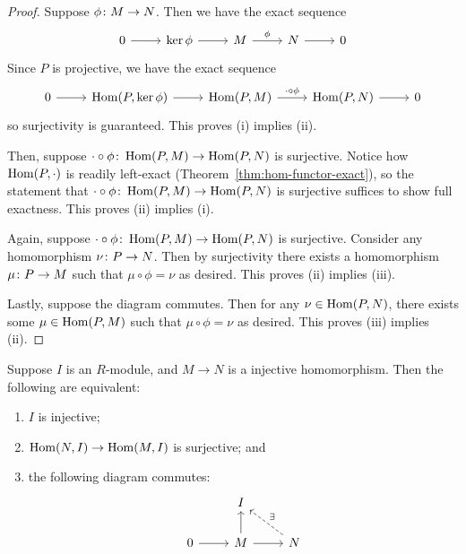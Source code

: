 \begin{proof}
    Suppose \(\phi\colon M\to N\).
    Then we have the exact sequence
    \begin{equation*}
        \begin{tikzcd}
            0 \arrow{r} & \ker\phi \arrow{r} & M \arrow{r}{\phi} & N \arrow{r} & 0
        \end{tikzcd}
    \end{equation*}
    Since \(P\) is projective, we have the exact sequence
    \begin{equation*}
        \begin{tikzcd}
            0 \arrow{r} & \Hom(P,\ker\phi) \arrow{r} &
            \Hom(P,M) \arrow{r}{\cdot\circ\phi} & \Hom(P,N) \arrow{r} & 0
        \end{tikzcd}
    \end{equation*}
    so surjectivity is guaranteed.
    This proves (i) implies (ii).

    Then, suppose \(\cdot\circ\phi\colon\operatorname{Hom}(P,M)\to\operatorname{Hom}(P,N)\) is surjective.
    Notice how \(\operatorname{Hom}(P,\cdot)\) is readily left-exact (Theorem~\ref{thm:hom-functor-exact}),
    so the statement that \(\cdot\circ\phi\colon\operatorname{Hom}(P,M)\to\operatorname{Hom}(P,N)\) is surjective
    suffices to show full exactness.
    This proves (ii) implies (i).

    Again, suppose \(\cdot\circ\phi\colon\operatorname{Hom}(P,M)\to\operatorname{Hom}(P,N)\) is surjective.
    Consider any homomorphism \(\nu\colon P\to N\).
    Then by surjectivity there exists a homomorphism \(\mu\colon P\to M\)
    such that \(\mu\circ\phi = \nu\) as desired.
    This proves (ii) implies (iii).
    
    Lastly, suppose the diagram commutes.
    Then for any \(\nu \in \operatorname{Hom}(P,N)\),
    there exists some \(\mu \in \operatorname{Hom}(P,M)\)
    such that \(\mu\circ\phi = \nu\) as desired.
    This proves (iii) implies (ii).
\end{proof}
\begin{proposition}
    Suppose \(I\) is an \(R\)-module,
    and \(M \to N\) is a injective homomorphism.
    Then the following are equivalent:
    \begin{enumerate}[label={(\roman*)}, itemsep=0mm]
        \item \(I\) is injective;
        \item \(\operatorname{Hom}(N,I) \to \operatorname{Hom}(M,I)\) is surjective; and
        \item the following diagram commutes:
            \begin{equation*}
                \begin{tikzcd}
                    & I \\
                    0 \arrow{r} & M \arrow{u} \arrow{r} & N \arrow[dashrightarrow]{ul}[swap]{\exists}
                \end{tikzcd}
            \end{equation*}
    \end{enumerate}
\end{proposition}
